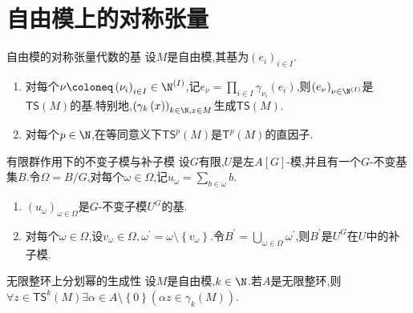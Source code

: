 \section{自由模上的对称张量}

\begin{proposition}{自由模的对称张量代数的基}{}
	设$M$是自由模,其基为$\left(e_{i}\right)_{i\in I}$.
	\begin{enumerate}
		\item 对每个$\nu\coloneq\left(\nu_{i}\right)_{i\in I}\in\N^{\left(I\right)}$,记$e_{\nu}=\prod\limits_{i\in I}\gamma_{\nu_{i}}\left(e_{i}\right)$,则$\left(e_{\nu}\right)_{\nu\in\N^{\left(I\right)}}$是$\mathsf{TS}\left(M\right)$的基.特别地,$\left(\gamma_{k}\left(x\right)\right)_{k\in\N,x\in M}$生成$\mathsf{TS}\left(M\right)$.
		\item 对每个$p\in\N$,在等同意义下$\mathsf{TS}^{p}\left(M\right)$是$\mathsf{T}^{p}\left(M\right)$的直因子.
	\end{enumerate}
\end{proposition}

\begin{lemma}{有限群作用下的不变子模与补子模}{}
	设$G$有限,$U$是左$A[G]$-模,并且有一个$G$-不变基集$B$.令$\Omega=B/G$,对每个$\omega\in\Omega$,记$u_{\omega}=\sum\limits_{b\in\omega}b$.
	\begin{enumerate}
		\item $\left(u_{\omega}\right)_{\omega\in\Omega}$是$G$-不变子模$U^{G}$的基.
		\item 对每个$\omega\in\Omega$,设$v_{\omega}\in\Omega,\omega^{\prime}=\omega\setminus\left\{v_{\omega}\right\}$.令$B^{\prime}=\bigcup\limits_{\omega\in\Omega}\omega^{\prime}$,则$B^{\prime}$是$U^{G}$在$U$中的补子模.
	\end{enumerate}
\end{lemma}

\begin{proposition}{无限整环上分划幂的生成性}{}
	设$M$是自由模,$k\in\N$.若$A$是无限整环,则$\forall z\in\mathsf{TS}^{k}\left(M\right)\exists\alpha\in A\setminus\left\{0\right\}\left(\alpha z\in\gamma_{k}\left(M\right)\right)$.
\end{proposition}














































